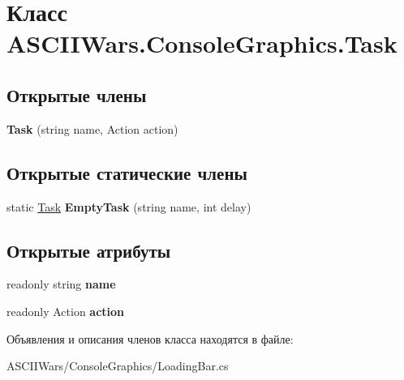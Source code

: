 \hypertarget{class_a_s_c_i_i_wars_1_1_console_graphics_1_1_task}{}\section{Класс A\+S\+C\+I\+I\+Wars.\+Console\+Graphics.\+Task}
\label{class_a_s_c_i_i_wars_1_1_console_graphics_1_1_task}
\subsection*{Открытые члены}
\begin{DoxyCompactItemize}
\item 
\hypertarget{class_a_s_c_i_i_wars_1_1_console_graphics_1_1_task_a2fe2e33110134ec07ed7ad5960976c6a}{}\label{class_a_s_c_i_i_wars_1_1_console_graphics_1_1_task_a2fe2e33110134ec07ed7ad5960976c6a} 
{\bfseries Task} (string name, Action action)
\end{DoxyCompactItemize}
\subsection*{Открытые статические члены}
\begin{DoxyCompactItemize}
\item 
\hypertarget{class_a_s_c_i_i_wars_1_1_console_graphics_1_1_task_a199974d73498b9de5c95c3e90864a59b}{}\label{class_a_s_c_i_i_wars_1_1_console_graphics_1_1_task_a199974d73498b9de5c95c3e90864a59b} 
static \hyperlink{class_a_s_c_i_i_wars_1_1_console_graphics_1_1_task}{Task} {\bfseries Empty\+Task} (string name, int delay)
\end{DoxyCompactItemize}
\subsection*{Открытые атрибуты}
\begin{DoxyCompactItemize}
\item 
\hypertarget{class_a_s_c_i_i_wars_1_1_console_graphics_1_1_task_a28591edbf75d92dcf956ce1c69a1e9ab}{}\label{class_a_s_c_i_i_wars_1_1_console_graphics_1_1_task_a28591edbf75d92dcf956ce1c69a1e9ab} 
readonly string {\bfseries name}
\item 
\hypertarget{class_a_s_c_i_i_wars_1_1_console_graphics_1_1_task_a9fcf12d48e7ae10b20db0828cedf4f7d}{}\label{class_a_s_c_i_i_wars_1_1_console_graphics_1_1_task_a9fcf12d48e7ae10b20db0828cedf4f7d} 
readonly Action {\bfseries action}
\end{DoxyCompactItemize}


Объявления и описания членов класса находятся в файле\+:\begin{DoxyCompactItemize}
\item 
A\+S\+C\+I\+I\+Wars/\+Console\+Graphics/Loading\+Bar.\+cs\end{DoxyCompactItemize}
